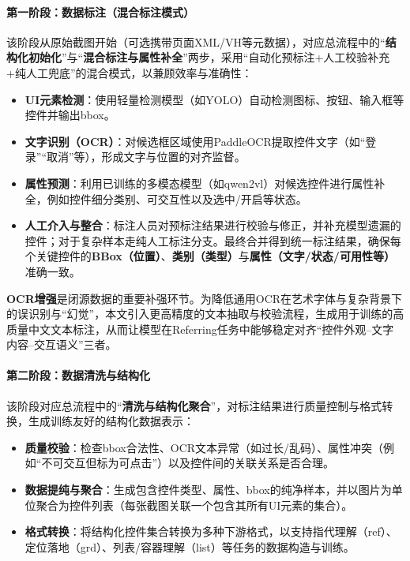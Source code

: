\paragraph{第一阶段：数据标注（混合标注模式）}
该阶段从原始截图开始（可选携带页面XML/VH等元数据），对应总流程中的“\textbf{结构化初始化}”与“\textbf{混合标注与属性补全}”两步，采用“自动化预标注+人工校验补充+纯人工兜底”的混合模式，以兼顾效率与准确性：
\begin{itemize}
  \item \textbf{UI元素检测}：使用轻量检测模型（如YOLO）自动检测图标、按钮、输入框等控件并输出bbox\citep{redmon2016yolo}。
  \item \textbf{文字识别（OCR）}：对候选框区域使用PaddleOCR提取控件文字（如“登录”“取消”等），形成文字与位置的对齐监督\citep{du2020ppocr}。
  \item \textbf{属性预测}：利用已训练的多模态模型（如qwen2vl）对候选控件进行属性补全，例如控件细分类别、可交互性以及选中/开启等状态\citep{bai2025qwen25vl}。
  \item \textbf{人工介入与整合}：标注人员对预标注结果进行校验与修正，并补充模型遗漏的控件；对于复杂样本走纯人工标注分支。最终合并得到统一标注结果，确保每个关键控件的\textbf{BBox（位置）}、\textbf{类别（类型）}与\textbf{属性（文字/状态/可用性等）}准确一致。
\end{itemize}

\textbf{OCR增强}是闭源数据的重要补强环节。为降低通用OCR在艺术字体与复杂背景下的误识别与“幻觉”，本文引入更高精度的文本抽取与校验流程，生成用于训练的高质量中文文本标注，从而让模型在Referring任务中能够稳定对齐“控件外观--文字内容--交互语义”三者。

\paragraph{第二阶段：数据清洗与结构化}
该阶段对应总流程中的“\textbf{清洗与结构化聚合}”，对标注结果进行质量控制与格式转换，生成训练友好的结构化数据表示：
\begin{itemize}
  \item \textbf{质量校验}：检查bbox合法性、OCR文本异常（如过长/乱码）、属性冲突（例如“不可交互但标为可点击”）以及控件间的关联关系是否合理。
  \item \textbf{数据提纯与聚合}：生成包含控件类型、属性、bbox的纯净样本，并以图片为单位聚合为控件列表（每张截图关联一个包含其所有UI元素的集合）。
  \item \textbf{格式转换}：将结构化控件集合转换为多种下游格式，以支持指代理解（ref）、定位落地（grd）、列表/容器理解（list）等任务的数据构造与训练。
\end{itemize}

